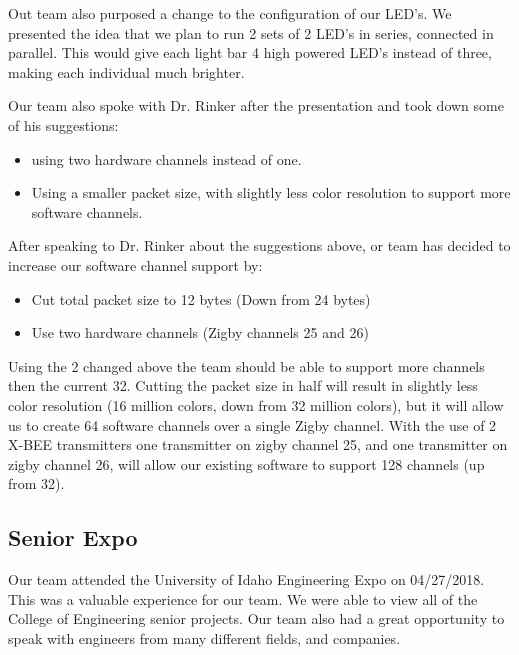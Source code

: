 \documentclass[12pt]{article}
\begin{document}
{{	\noindent
	Out team also purposed a change to the configuration of our LED's. We presented 		the idea that we plan to run 2 sets of 2 LED's in series, connected in parallel. 		This would give each light bar 4 high powered LED's instead of three, making each 	individual much brighter.
	
	\noindent
	Our team also spoke with Dr. Rinker after the presentation and took down some of 		his suggestions:
	\begin{itemize}
	\item using two hardware channels instead of one.
	\item Using a smaller packet size, with slightly less color resolution to support 	more software channels.
	\end{itemize}
	
	\noindent
	After speaking to Dr. Rinker about the suggestions above, or team has decided to 		increase our software channel support by:
	\begin{itemize}
	\item Cut total packet size to 12 bytes (Down from 24 bytes)
	\item Use two hardware channels (Zigby channels 25 and 26)
	\end{itemize}
	
	\noindent
	Using the 2 changed above the team should be able to support more channels then 		the current 32. Cutting the packet size in half will result in slightly less 			color resolution (16 million colors, down from 32 million colors), but it will 			allow us to create 64 software channels over a single Zigby channel. With the use 	of 2 X-BEE transmitters one transmitter on zigby channel 25, and one transmitter 		on zigby channel 26, will allow our existing software to support 128 channels (up 	from 32).
	
	\clearpage
	
	\subsection{Senior Expo}
	Our team attended the University of Idaho Engineering Expo on 04/27/2018.\\
	
	\noindent
	This was a valuable experience for our team. We were able to view all of the 			College of Engineering senior projects. Our team also had a great opportunity to 		speak with engineers from many different fields, and companies.\\
	
}}
\end{document}
